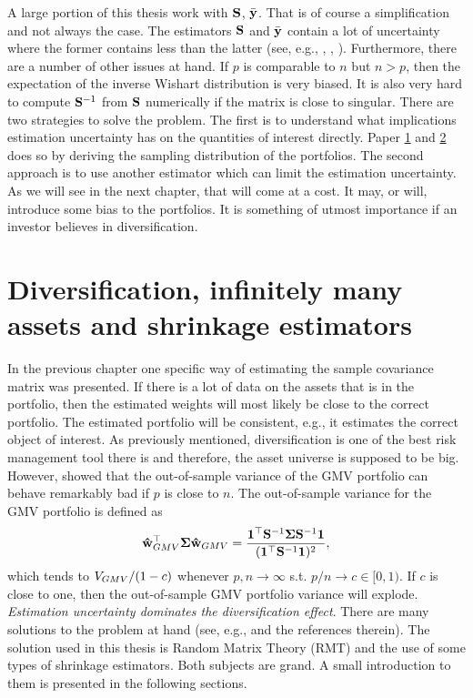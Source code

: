 \documentclass[12pt, oneside]{book}\usepackage{knitr}
\begin{document}
{A large portion of this thesis work with $\mathbf{S}$, $\bar{\mathbf{y}}$.
That is of course a simplification and not always the case.
The estimators $\mathbf{S}$ and $\bar{\mathbf{y}}$ contain a lot of uncertainty where the former contains less than the latter (see, e.g., \citet{frankfurter1971portfolio}, \citet{merton1980estimating}, \citet{best1991sensitivity}). 
Furthermore, there are a number of other issues at hand.
If $p$ is comparable to $n$ but $n>p$, then the expectation of the inverse Wishart distribution is very biased.
It is also very hard to compute $\mathbf{S}^{-1}$ from $\mathbf{S}$ numerically if the matrix is close to singular.
There are two strategies to solve the problem.
The first is to understand what implications estimation uncertainty has on the quantities of interest directly.
Paper \hyperref[sec:paper1]{1} and \hyperref[sec:paper2]{2} does so by deriving the sampling distribution of the portfolios.
The second approach is to use another estimator which can limit the estimation uncertainty.
As we will see in the next chapter, that will come at a cost.
It may, or will, introduce some bias to the portfolios.
It is something of utmost importance if an investor believes in diversification.

\chapter{Diversification, infinitely many assets and shrinkage estimators}\label{ch:highdim}


In the previous chapter one specific way of estimating the sample covariance matrix was presented.
If there is a lot of data on the assets that is in the portfolio, then the estimated weights will most likely be close to the correct portfolio.
The estimated portfolio will be consistent, e.g., it estimates the correct object of interest. 
As previously mentioned, diversification is one of the best risk management tool there is and therefore, the asset universe is supposed to be big.
However, \citet{bodnar2016optimal} showed that the out-of-sample variance of the GMV portfolio can behave remarkably bad if $p$ is close to $n$.
The out-of-sample variance for the GMV portfolio is defined as 
\begin{equation}\label{eqn:oot_var}
  \mathbf{\hat{w}}_{GMV}^\top \mathbf{\Sigma} \mathbf{\hat{w}}_{GMV} = \frac{\mathbf{1}^\top \mathbf{S}^{-1} \mathbf{\Sigma} \mathbf{S}^{-1} \mathbf{1} }{(\mathbf{1}^\top \mathbf{S}^{-1} \mathbf{1})^2},
\end{equation}
which tends to $V_{GMV}/(1-c)$ whenever $p,n \rightarrow \infty$ s.t. $p/n \rightarrow c \in [0,1)$. 
If $c$ is close to one, then the out-of-sample GMV portfolio variance will explode. 
\textit{Estimation uncertainty dominates the diversification effect}.
There are many solutions to the problem at hand (see, e.g., \citet{lw17} and the references therein). 
The solution used in this thesis is Random Matrix Theory (RMT) and the use of some types of shrinkage estimators. 
Both subjects are grand.
A small introduction to them is presented in the following sections.

}
\end{document}
